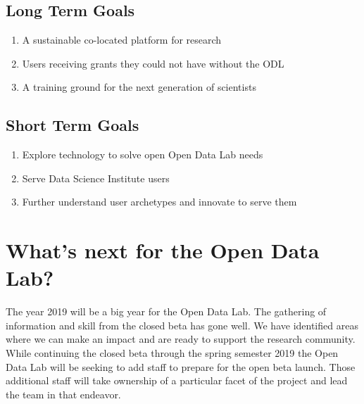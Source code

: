 \subsection*{Long Term Goals}
\begin{enumerate}
\item A sustainable co-located platform for research
\item Users receiving grants they could not have without the ODL
\item A training ground for the next generation of scientists
\end{enumerate}

\subsection*{Short Term Goals}
\begin{enumerate}
\item Explore technology to solve open Open Data Lab needs
\item Serve Data Science Institute users
\item Further understand user archetypes and innovate to serve them
\end{enumerate}

\section{What's next for the Open Data Lab?}
The year 2019 will be a big year for the Open Data Lab. The gathering of information and skill from the closed beta has gone well. We have identified areas where we can make an impact and are ready to support the research community. While continuing the closed beta through the spring semester 2019 the Open Data Lab will be seeking to add staff to prepare for the open beta launch. Those additional staff will take ownership of a particular facet of the project and lead the team in that endeavor.